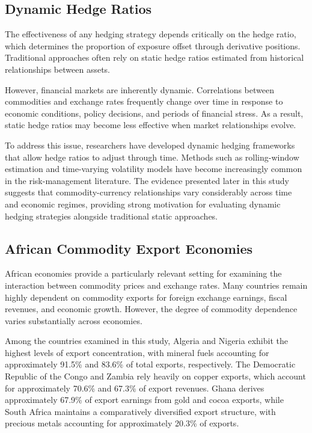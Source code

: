 \documentclass{article}
\begin{document}
\subsection{Dynamic Hedge Ratios}

The effectiveness of any hedging strategy depends critically on the hedge ratio, which determines the proportion of exposure offset through derivative positions. Traditional approaches often rely on static hedge ratios estimated from historical relationships between assets.

However, financial markets are inherently dynamic. Correlations between commodities and exchange rates frequently change over time in response to economic conditions, policy decisions, and periods of financial stress. As a result, static hedge ratios may become less effective when market relationships evolve.

To address this issue, researchers have developed dynamic hedging frameworks that allow hedge ratios to adjust through time. Methods such as rolling-window estimation and time-varying volatility models have become increasingly common in the risk-management literature. The evidence presented later in this study suggests that commodity-currency relationships vary considerably across time and economic regimes, providing strong motivation for evaluating dynamic hedging strategies alongside traditional static approaches.

\subsection{African Commodity Export Economies}

African economies provide a particularly relevant setting for examining the interaction between commodity prices and exchange rates. Many countries remain highly dependent on commodity exports for foreign exchange earnings, fiscal revenues, and economic growth. However, the degree of commodity dependence varies substantially across economies.

Among the countries examined in this study, Algeria and Nigeria exhibit the highest levels of export concentration, with mineral fuels accounting for approximately 91.5\% and 83.6\% of total exports, respectively. The Democratic Republic of the Congo and Zambia rely heavily on copper exports, which account for approximately 70.6\% and 67.3\% of export revenues. Ghana derives approximately 67.9\% of export earnings from gold and cocoa exports, while South Africa maintains a comparatively diversified export structure, with precious metals accounting for approximately 20.3\% of exports.
\end{document}
